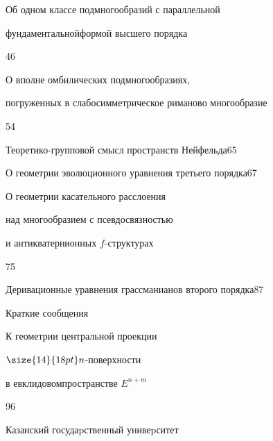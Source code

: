 

{Об одном классе подмногообразий с параллельной


фундаментальной\newline формой высшего порядка}{46}




{О вполне омбилических подмногообразиях,


погруженных в слабо\newline симметрическое риманово многообразие}{54}




{Теоретико-групповой смысл пространств Нейфельда}{65}




{О геометрии эволюционного уравнения третьего порядка}{67}




{О геометрии касательного расслоения


над многообразием с псевдосвязностью\newline


и антикватернионных $f$-структурах}{75}




{Деривационные уравнения грассманианов второго порядка}{87}





\bigskip


{\centerline {Краткие сообщения}}


\bigskip







{К геометрии центральной проекции


$\size{14}{18pt}\selectfont n$-поверхности


в евклидовом\newline пространстве $E^{n+m}$}{96}














\vfill


\noindent\raisebox{2pt}{\copyright} Казанский госудаpственный унивеpситет





